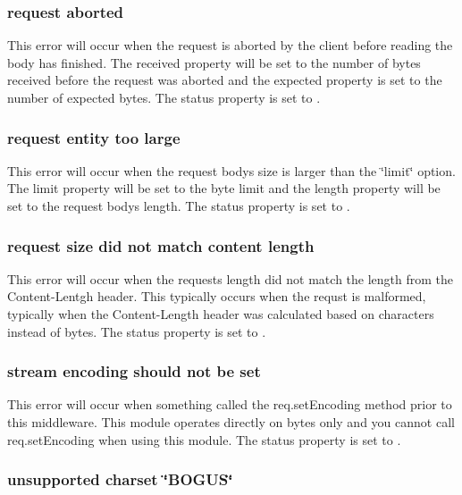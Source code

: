 \subsubsection*{request aborted}

This error will occur when the request is aborted by the client before reading the body has finished. The {\ttfamily received} property will be set to the number of bytes received before the request was aborted and the {\ttfamily expected} property is set to the number of expected bytes. The {\ttfamily status} property is set to {}.

\subsubsection*{request entity too large}

This error will occur when the request body\textquotesingle{}s size is larger than the \char`\"{}limit\char`\"{} option. The {\ttfamily limit} property will be set to the byte limit and the {\ttfamily length} property will be set to the request body\textquotesingle{}s length. The {\ttfamily status} property is set to {}.

\subsubsection*{request size did not match content length}

This error will occur when the request\textquotesingle{}s length did not match the length from the {\ttfamily Content-\/\+Lentgh} header. This typically occurs when the requst is malformed, typically when the {\ttfamily Content-\/\+Length} header was calculated based on characters instead of bytes. The {\ttfamily status} property is set to {}.

\subsubsection*{stream encoding should not be set}

This error will occur when something called the {\ttfamily req.\+set\+Encoding} method prior to this middleware. This module operates directly on bytes only and you cannot call {\ttfamily req.\+set\+Encoding} when using this module. The {\ttfamily status} property is set to {}.

\subsubsection*{unsupported charset \char`\"{}\+B\+O\+G\+U\+S\char`\"{}}

